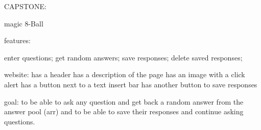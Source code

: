 CAPSTONE:


magic 8-Ball

features:

enter questions; 
get random answers; 
save responses; 
delete saved responses;


website:
has a header
has a description of the page
has an image with a click alert
has a button next to a text insert bar
has another button to save responses


goal:
to be able to ask any question 
and get back a random answer from 
the answer pool (arr) and to be able 
to save their responses and continue 
asking questions.